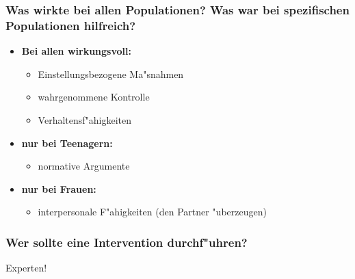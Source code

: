 \subsubsection{Was wirkte bei allen Populationen? Was war bei spezifischen Populationen hilfreich?}
\begin{itemize}
        \item \textbf{Bei allen wirkungsvoll:}
                \begin{itemize}
                        \item Einstellungsbezogene Ma"snahmen
                        \item wahrgenommene Kontrolle
                        \item Verhaltensf"ahigkeiten
                \end{itemize}
        \item \textbf{nur bei Teenagern:}
                \begin{itemize}
                        \item normative Argumente
                \end{itemize}
        \item \textbf{nur bei Frauen:}
                \begin{itemize}
                        \item interpersonale F"ahigkeiten (den Partner "uberzeugen)
                \end{itemize}
\end{itemize}

\subsubsection{Wer sollte eine Intervention durchf"uhren?}
Experten!
